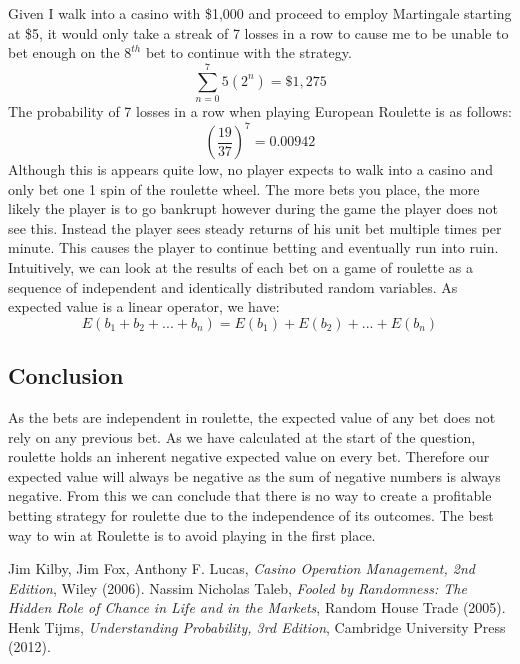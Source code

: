\documentclass[12pt]{article}
\begin{document}
Given I walk into a casino with \$1,000 and proceed to employ Martingale starting at \$5, it would only take a streak of 7 losses in a row to cause me to be unable to bet enough on the $8^{th}$ bet to continue with the strategy.
$$\sum^{7}_{n=0}5(2^n)=\$1,275$$
The probability of 7 losses in a row when playing European Roulette is as follows:
$$\left(\frac{19}{37}\right)^7=0.00942$$
Although this is appears quite low, no player expects to walk into a casino and only bet one 1 spin of the roulette wheel. The more bets you place, the more likely the player is to go bankrupt however during the game the player does not see this. Instead the player sees steady returns of his unit bet multiple times per minute. This causes the player to continue betting and eventually run into ruin. Intuitively, we can look at the results of each bet on a game of roulette as a sequence of independent and identically distributed random variables. As expected value is a linear operator, we have:
$$E(b_1+b_2+...+b_n)=E(b_1)+E(b_2)+...+E(b_n)$$
\subsection{Conclusion}
As the bets are independent in roulette, the expected value of any bet does not rely on any previous bet. As we have calculated at the start of the question, roulette holds an inherent negative expected value on every bet. Therefore our expected value will always be negative as the sum of negative numbers is always negative. From this we can conclude that there is no way to create a profitable betting strategy for roulette due to the independence of its outcomes. The best way to win at Roulette is to avoid playing in the first place.
\begin{thebibliography}{3}
  Jim Kilby, Jim Fox, Anthony F. Lucas,
  \emph{Casino Operation Management, 2nd Edition},
  Wiley (2006).
  Nassim Nicholas Taleb,
  \emph{Fooled by Randomness: The Hidden Role of Chance in Life and in the Markets},
  Random House Trade (2005).
  Henk Tijms,
  \emph{Understanding Probability, 3rd Edition},
  Cambridge University Press (2012).
\end{thebibliography}
\end{document}
